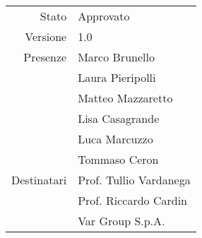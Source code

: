 \begin{center}
\begin{tabular}{r|l}
	Stato & Approvato \\
	Versione & 1.0 \\
	Presenze & Marco Brunello \\
	         & Laura Pieripolli \\
	         & Matteo Mazzaretto \\
	         & Lisa Casagrande \\
	         & Luca Marcuzzo \\
			 & Tommaso Ceron \\
	Destinatari & Prof. Tullio Vardanega \\
	            & Prof. Riccardo Cardin \\
				& Var Group S.p.A. \\
\end{tabular}
\end{center}